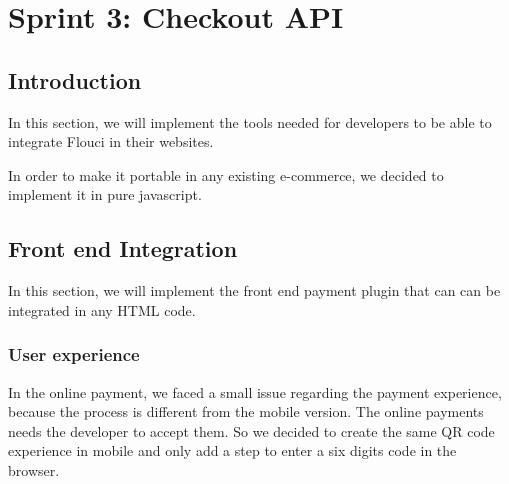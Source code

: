 
\setcounter{chapter}{4}
\chapter{Sprint 3: Checkout API}
\minitoc %
\graphicspath{{Chapter5/figures/}}

\pagestyle{fancy}
\fancyhf{}
\fancyhead[R]{\bfseries\rightmark}
\fancyfoot[R]{\thepage}
\renewcommand{\headrulewidth}{0.5pt}
\renewcommand{\footrulewidth}{0pt}
\renewcommand{\chaptermark}[1]{\markboth{\MakeUppercase{\chaptername~\thechapter. #1 }}{}}
\renewcommand{\sectionmark}[1]{\markright{\thechapter.\thesection~ #1}}


\begin{spacing}{1.2}

\section*{Introduction}
In this section, we will implement the tools needed for developers to be able to integrate Flouci in their websites. 

In order to make it portable in any existing e-commerce, we decided to implement it in pure javascript.
\section{Front end Integration}
In this section, we will implement the front end payment plugin that can can be integrated in any HTML code.
\subsection{User experience}
In the online payment, we faced a small issue regarding the payment experience, because the process is different from the mobile version. The online payments needs the developer to accept them.
So we decided to create the same QR code experience in mobile and only add a step to enter a six digits code in the browser.


\end{spacing}
